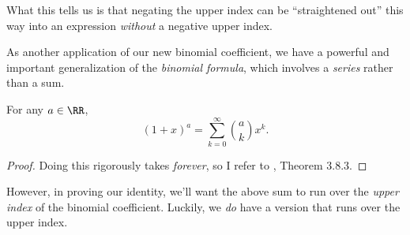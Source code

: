 \documentclass{article}
\begin{document}
What this tells us is that negating the upper index can be ``straightened out'' this way into an expression \textit{without} a negative upper index.

As another application of our new binomial coefficient, we have a powerful and important generalization of the \textit{binomial formula}, which involves a \textit{series} rather than a sum.

\begin{theorem}
    For any $a \in \RR$,
    \[
        (1+x)^a = \sum_{k=0}^\infty \binom{a}{k} x^k.
    \]
\end{theorem}

\begin{proof}
    Doing this rigorously takes \textit{forever}, so I refer to \cite{GrinbergAC}, Theorem 3.8.3.
\end{proof}

However, in proving our identity, we'll want the above sum to run over the \textit{upper index} of the binomial coefficient.
Luckily, we \textit{do} have a version that runs over the upper index.
\end{document}
